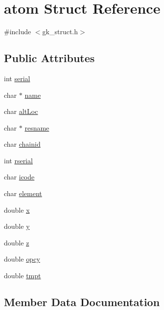 \hypertarget{a00658}{}\section{atom Struct Reference}
\label{a00658}


{\ttfamily \#include $<$gk\+\_\+struct.\+h$>$}

\subsection*{Public Attributes}
\begin{DoxyCompactItemize}
\item 
int \hyperlink{a00658_ad45e6aafd641f6ed2eb77865f60d90d3}{serial}
\item 
char $\ast$ \hyperlink{a00658_ac64febfef5e9a65be5ced72df2f35f2f}{name}
\item 
char \hyperlink{a00658_a58394b79c284cdfe3c76731fe67a4cd6}{alt\+Loc}
\item 
char $\ast$ \hyperlink{a00658_aefce1d0733ca41ce500827729fde1239}{resname}
\item 
char \hyperlink{a00658_a98bc9c8068bff47590dd812f1ccd5e9a}{chainid}
\item 
int \hyperlink{a00658_aa4e2ac95e55329c8c57bbd218a2c5dda}{rserial}
\item 
char \hyperlink{a00658_aa5fede9d98d26f6eceb26761d583992b}{icode}
\item 
char \hyperlink{a00658_a99f27d9e1ab04633227c9c9586fbc561}{element}
\item 
double \hyperlink{a00658_a3663325df6d9aaebad7d70c3f4a1c546}{x}
\item 
double \hyperlink{a00658_ae0ceb481033f0710f0e2d50c281c0d4e}{y}
\item 
double \hyperlink{a00658_ac42f4b22143f6cda6bd26bfa01896a65}{z}
\item 
double \hyperlink{a00658_a9c8491ea36643ec020390474c292ce33}{opcy}
\item 
double \hyperlink{a00658_a1adb2549c50f0d7ef72b714bbe89726f}{tmpt}
\end{DoxyCompactItemize}


\subsection{Member Data Documentation}
\mbox{\label{a00658_a58394b79c284cdfe3c76731fe67a4cd6}} 
